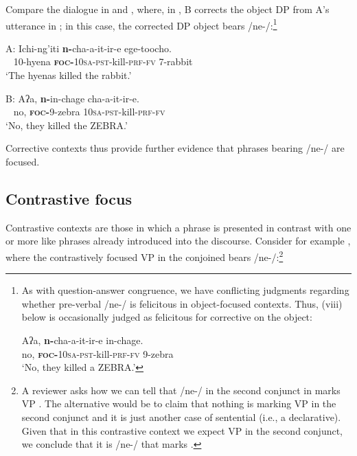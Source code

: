 \documentclass[output=paper,modfonts]{langscibook}
\begin{document}
Compare the dialogue in  and , where, in , B corrects the object DP from A’s utterance in ; in this case, the corrected DP object bears /ne-/:\footnote{
As with question-answer congruence, we have conflicting judgments regarding whether pre-verbal /ne-/ is felicitous in object-focused contexts. Thus, (viii) below is occasionally judged as felicitous for corrective  on the object:

\ea
\gll Aʔa, \textbf{n-}cha-a-it-ir-e in-chage.\\
no, \textsc{\textbf{foc-}}\textsc{10sa}-\textsc{pst}-kill-\textsc{prf}-\textsc{fv} 9-zebra\\
\glt ‘No, they killed a ZEBRA.’
\z
}  

\ea\label{ex:landmann:20}
\gll A: Ichi-ng’iti \textbf{n-}cha-a-it-ir-e ege-toocho.\\
    ~ 10-hyena \textsc{\textbf{foc-}}\textsc{10sa}-\textsc{pst}-kill-\textsc{prf}-\textsc{fv} 7-rabbit\\
\glt ‘The hyenas killed the rabbit.’
\z

\ea\label{ex:landmann:21}
\gll B: Aʔa, \textbf{n-}in-chage cha-a-it-ir-e.\\
    ~ no, \textsc{\textbf{foc-}}9-zebra \textsc{10sa}-\textsc{pst}-kill-\textsc{prf}-\textsc{fv}\\
\glt ‘No, they killed the ZEBRA.’
\z

Corrective  contexts thus provide further evidence that phrases bearing /ne-/ are focused.


\subsection{Contrastive focus}



Contrastive  contexts are those in which a phrase is presented in contrast with one or more like phrases already introduced into the discourse. Consider for example , where the contrastively focused VP in the conjoined  bears /ne-/:\footnote{A reviewer asks how we can tell that /ne-/ in the second conjunct in  marks VP . The alternative would be to claim that nothing is marking VP  in the second conjunct and it is just another case of sentential  (i.e., a declarative). Given that in this contrastive context we expect VP  in the second conjunct, we conclude that it is /ne-/ that marks .}
\end{document}
